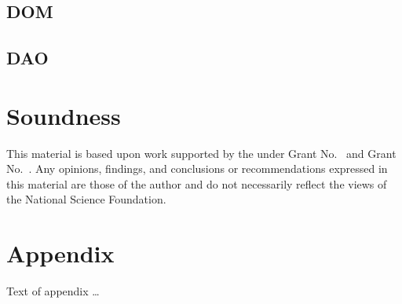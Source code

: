 \documentclass[acmsmall,review,anonymous]{acmart}\settopmatter{printfolios=true,printccs=false,printacmref=false}
\begin{document}
\subsection{DOM}

\subsection{DAO}

\section{Soundness}




\begin{acks}                            %
  This material is based upon work supported by the
   under Grant
  No.~ and Grant
  No.~.  Any opinions, findings, and
  conclusions or recommendations expressed in this material are those
  of the author and do not necessarily reflect the views of the
  National Science Foundation.
\end{acks}





\appendix
\section{Appendix}

Text of appendix \ldots
\end{document}
